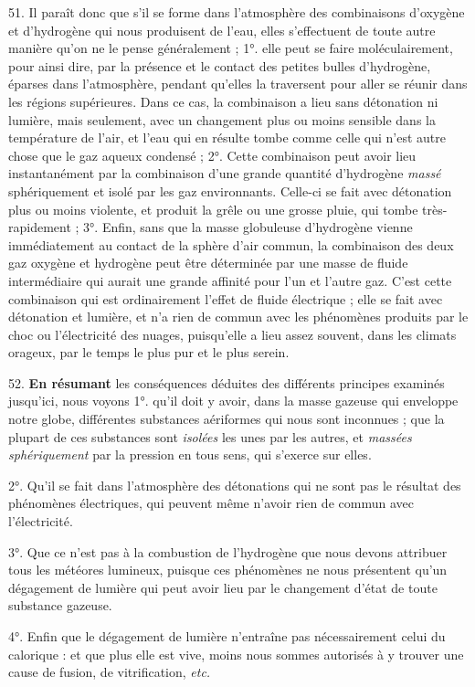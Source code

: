 \documentclass[a4paper, 11pt, oneside, polutonikogreek, french]{article}
\begin{document}
51. Il paraît donc que s'il se forme dans l'atmosphère des combinaisons d'oxygène et d'hydrogène qui nous produisent de l'eau, elles s'effectuent de toute autre manière qu'on ne le pense généralement ; 1°. elle peut se faire moléculairement, pour ainsi dire, par la présence et le contact des petites bulles d'hydrogène, éparses dans l'atmosphère, pendant qu'elles la traversent pour aller se réunir dans les régions supérieures. Dans ce cas, la combinaison a lieu sans détonation ni lumière, mais seulement, avec un changement plus ou moins sensible dans la température de l'air, et l'eau qui en résulte tombe comme celle qui n'est autre chose que le gaz aqueux condensé ; 2°. Cette combinaison peut avoir lieu instantanément par la combinaison d'une grande quantité d'hydrogène \emph{massé} sphériquement et isolé par les gaz environnants. Celle-ci se fait avec détonation plus ou moins violente, et produit la grêle ou une grosse pluie, qui tombe très-rapidement ; 3°. Enfin, sans que la masse globuleuse d'hydrogène vienne immédiatement au contact de la sphère d'air commun, la combinaison des deux gaz oxygène et hydrogène peut être déterminée par une masse de fluide intermédiaire qui aurait une grande affinité pour l'un et l'autre gaz. C'est cette combinaison qui est ordinairement l'effet de fluide électrique ; elle se fait avec détonation et lumière, et n'a rien de commun avec les phénomènes produits par le choc ou l'électricité des nuages, puisqu'elle a lieu assez souvent, dans les climats orageux, par le temps le plus pur et le plus serein.

52. \textbf{En résumant} les conséquences déduites des différents principes examinés jusqu'ici, nous voyons 1°. qu'il doit y avoir, dans la masse gazeuse qui enveloppe notre globe, différentes substances aériformes qui nous sont inconnues ; que la plupart de ces substances sont \emph{isolées} les unes par les autres, et \emph{massées sphériquement} par la pression en tous sens, qui s'exerce sur elles.

2°. Qu'il se fait dans l'atmosphère des détonations qui ne sont pas le résultat des phénomènes électriques, qui peuvent même n'avoir rien de commun avec l'électricité.

3°. Que ce n'est pas à la combustion de l'hydrogène que nous devons attribuer tous les météores lumineux, puisque ces phénomènes ne nous présentent qu'un dégagement de lumière qui peut avoir lieu par le changement d'état de toute substance gazeuse.

4°. Enfin que le dégagement de lumière n'entraîne pas nécessairement celui du calorique : et que plus elle est vive, moins nous sommes autorisés à y trouver une cause de fusion, de vitrification, \emph{etc.}
\end{document}
